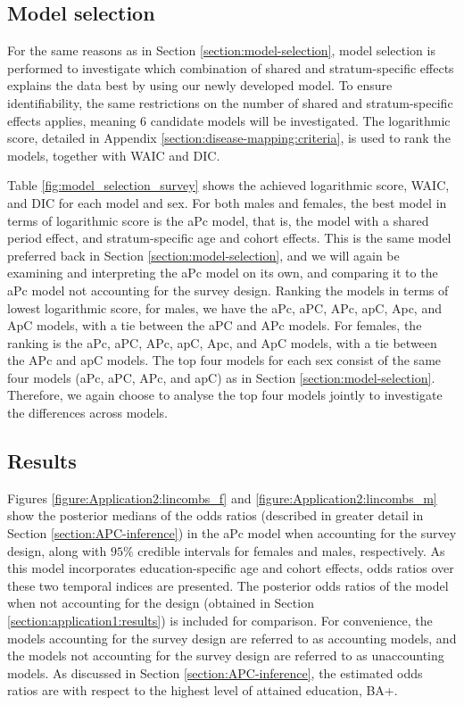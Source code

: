 \subsection{Model selection}
\label{section:application2:model_selection}
For the same reasons as in Section \ref{section:model-selection}, model selection is performed to investigate which combination of shared and stratum-specific effects explains the data best by using our newly developed model. To ensure identifiability, the same restrictions on the number of shared and stratum-specific effects applies, meaning $6$ candidate models will be investigated. The logarithmic score, detailed in Appendix \ref{section:disease-mapping:criteria}, is used to rank the models, together with WAIC and DIC.



Table \ref{fig:model_selection_survey} shows the achieved logarithmic score, WAIC, and DIC for each model and sex. For both males and females, the best model in terms of logarithmic score is the aPc model, that is, the model with a shared period effect, and stratum-specific age and cohort effects. This is the same model preferred back in Section \ref{section:model-selection}, and we will again be examining and interpreting the aPc model on its own, and comparing it to the aPc model not accounting for the survey design. Ranking the models in terms of lowest logarithmic score, for males, we have the aPc, aPC, APc, apC, Apc, and ApC models, with a tie between the aPC and APc models. For females, the ranking is the aPc, aPC, APc, apC, Apc, and ApC models, with a tie between the APc and apC models. The top four models for each sex consist of the same four models (aPc, aPC, APc, and apC) as in Section \ref{section:model-selection}. Therefore, we again choose to analyse the top four models jointly to investigate the differences across models.

\FloatBarrier
\subsection{Results}
\label{section:application2:results}
\vspace{-0.2cm}
Figures \ref{figure:Application2:lincombs_f} and \ref{figure:Application2:lincombs_m} show the posterior medians of the odds ratios (described in greater detail in Section \ref{section:APC-inference}) in the aPc model when accounting for the survey design, along with $95\%$ credible intervals for females and males, respectively. As this model incorporates education-specific age and cohort effects, odds ratios over these two temporal indices are presented. The posterior odds ratios of the model when not accounting for the design (obtained in Section \ref{section:application1:results}) is included for comparison. For convenience, the models accounting for the survey design are referred to as accounting models, and the models not accounting for the survey design are referred to as unaccounting models. As discussed in Section \ref{section:APC-inference}, the estimated odds ratios are with respect to the highest level of attained education, BA+. 

